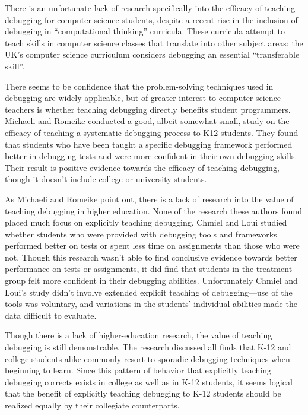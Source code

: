 \documentclass[12pt]{article}
\begin{document}
There is an unfortunate lack of research specifically into the
efficacy of teaching debugging for computer science students, despite
a recent rise in the inclusion of debugging in ``computational
thinking'' curricula\cite{10.1145/3361721.3361724}.  These
curricula attempt to teach skills in computer science classes that
translate into other subject areas: the UK's computer science
curriculum considers debugging an essential ``transferable
skill''\cite{10.1145/2602484}.\par

There seems to be confidence that the problem-solving techniques used
in debugging are widely applicable, but of greater interest to
computer science teachers is whether teaching debugging directly
benefits student programmers.  Michaeli and Romeike conducted a good,
albeit somewhat small, study on the efficacy of teaching a systematic
debugging process to K12 students.  They found that students who have
been taught a specific debugging framework performed better in
debugging tests and were more confident in their own debugging
skills\cite{10.1145/3361721.3361724}.  Their result is positive
evidence towards the efficacy of teaching debugging, though it doesn't
include college or university students.\par

As Michaeli and Romeike point out, there is a lack of research into
the value of teaching debugging in higher education.  None of the
research these authors found placed much focus on explicitly teaching
debugging.  Chmiel and Loui studied whether students who were provided
with debugging tools and frameworks performed better on tests or spent
less time on assignments than those who were
not\cite{10.1145/971300.971310}.  Though this research wasn't able to
find conclusive evidence towards better performance on tests or
assignments, it did find that students in the treatment group felt
more confident in their debugging abilities.  Unfortunately Chmiel and
Loui's study didn't involve extended explicit teaching of
debugging---use of the tools was voluntary, and variations in the
students' individual abilities made the data difficult to
evaluate.\par

Though there is a lack of higher-education research, the value of
teaching debugging is still demonstrable.  The research discussed all
finds that K-12 and college students alike commonly resort to sporadic
debugging techniques when beginning to learn.  Since this pattern of
behavior that explicitly teaching debugging corrects exists in college
as well as in K-12 students, it seems logical that the benefit of
explicitly teaching debugging to K-12 students should be realized
equally by their collegiate counterparts.\par
\end{document}
